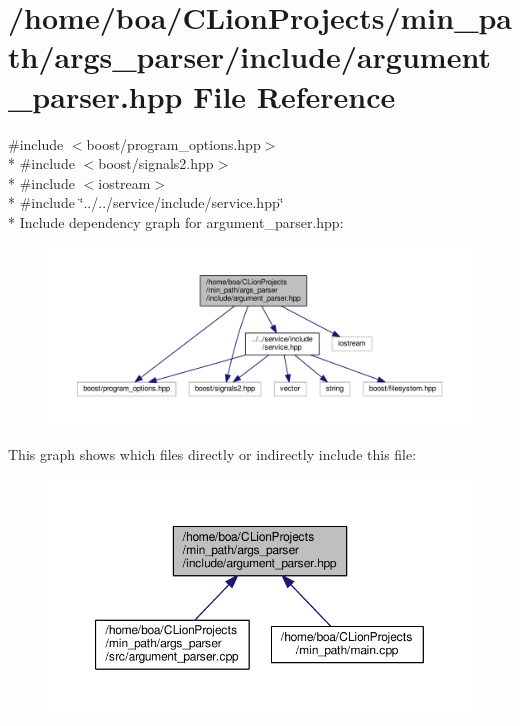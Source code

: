 \hypertarget{a00011}{}\section{/home/boa/\+C\+Lion\+Projects/min\+\_\+path/args\+\_\+parser/include/argument\+\_\+parser.hpp File Reference}
\label{a00011}
{\ttfamily \#include $<$boost/program\+\_\+options.\+hpp$>$}\\*
{\ttfamily \#include $<$boost/signals2.\+hpp$>$}\\*
{\ttfamily \#include $<$iostream$>$}\\*
{\ttfamily \#include \char`\"{}../../service/include/service.\+hpp\char`\"{}}\\*
Include dependency graph for argument\+\_\+parser.\+hpp\+:
\nopagebreak
\begin{figure}[H]
\begin{center}
\leavevmode
\includegraphics[width=350pt]{db/d3a/a00040}
\end{center}
\end{figure}
This graph shows which files directly or indirectly include this file\+:
\nopagebreak
\begin{figure}[H]
\begin{center}
\leavevmode
\includegraphics[width=350pt]{dd/d32/a00041}
\end{center}
\end{figure}
